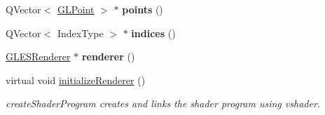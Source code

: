 \begin{DoxyCompactItemize}
\mbox{\label{class_g_l_item_a30a7ce7ab52ac63010cc3f692406b259}} 
Q\+Vector$<$ \mbox{\hyperlink{class_g_l_point}{G\+L\+Point}} $>$ $\ast$ {\bfseries points} ()
\item 
\mbox{\label{class_g_l_item_ab14e096f79b7499d20e9cbcf69bf181a}} 
Q\+Vector$<$ Index\+Type $>$ $\ast$ {\bfseries indices} ()
\item 
\mbox{\label{class_g_l_item_a4575b8c146849022b567a75b4f9cfa8e}} 
\mbox{\hyperlink{class_g_l_e_s_renderer}{G\+L\+E\+S\+Renderer}} $\ast$ {\bfseries renderer} ()
\item 
\mbox{\label{class_g_l_item_aa77a50c3152b78113ba43752d20211f5}} 
virtual void \mbox{\hyperlink{class_g_l_item_aa77a50c3152b78113ba43752d20211f5}{initialize\+Renderer}} ()
\begin{DoxyCompactList}\small\item\em create\+Shader\+Program creates and links the shader program using vshader. \end{DoxyCompactList}\end{DoxyCompactItemize}
